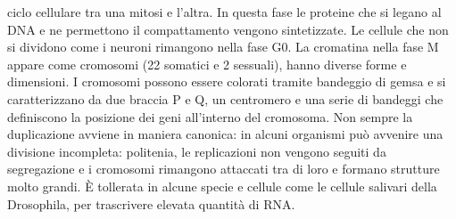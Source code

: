 ciclo cellulare tra una mitosi e l'altra. In questa fase le proteine che si legano al DNA e ne permettono il compattamento vengono sintetizzate. Le cellule che non si dividono come i 
neuroni rimangono nella fase G0. La cromatina nella fase M appare come cromosomi (22 somatici e 2 sessuali), hanno diverse forme e dimensioni. I cromosomi possono essere colorati tramite
bandeggio di gemsa e si caratterizzano da due braccia P e Q, un centromero e una serie di bandeggi che definiscono la posizione dei geni all'interno del cromosoma. Non sempre la 
duplicazione avviene in maniera canonica: in alcuni organismi pu\`o avvenire una divisione incompleta: politenia, le replicazioni non vengono seguiti da segregazione e i cromosomi 
rimangono attaccati tra di loro e formano strutture molto grandi. \`E tollerata in alcune specie e cellule come le cellule salivari della Drosophila, per trascrivere elevata quantit\`a di
RNA. 
